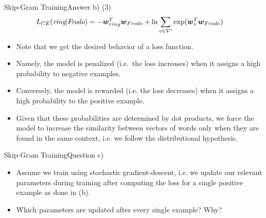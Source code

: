 \documentclass[t]{beamer}
\begin{document}
\begin{frame}{Skip-Gram Training}{Answer b) (3)}
    \begin{align*}
        L_{CE}(\textit{ring}|\textit{Frodo}) & = - {\boldsymbol{w}}_{ring}^T{\boldsymbol{w}}_{Frodo} + \ln \sum_{v\in V'} \text{exp}({\boldsymbol{w}}_{v}^T{\boldsymbol{w}}_{Frodo})
    \end{align*}
    \begin{itemize}
        \item Note that we get the desired behavior of a loss function.
        \item Namely, the model is penalized (i.e.\ the loss increases) when it
              assigns a high probability to negative examples.
        \item Conversely, the model is rewarded (i.e. the loss decreases) when
              it assigns a high probability to the positive example.
        \item Given that these probabilities are determined by dot products, we
              force the model to increase the similarity between vectors of
              words only when they are found in the same context, i.e. we follow
              the distributional hypothesis.
    \end{itemize}
\end{frame}

\begin{frame}{Skip-Gram Training}{Question c)}
    \begin{itemize}
        \item Assume we train using stochastic gradient-descent, i.e. we update
              our relevant parameters during training after computing the loss
              for a single positive example as done in (b).
        \item Which parameters are updated after every single example? Why?
    \end{itemize}
\end{frame}
\end{document}
